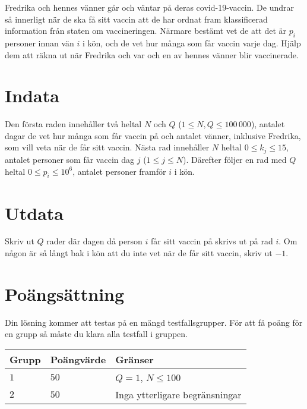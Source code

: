
Fredrika och hennes vänner går och väntar på deras covid-19-vaccin. De undrar så innerligt när de ska få sitt vaccin att de har ordnat fram klassificerad information från staten om vaccineringen. Närmare bestämt vet de att det är $p_i$ personer innan vän $i$ i kön, och de vet hur många som får vaccin varje dag. Hjälp dem att räkna ut när Fredrika och var och en av hennes vänner blir vaccinerade. 

\section*{Indata}
Den första raden innehåller två heltal $N$ och $Q$ ($1 \le N,Q \le 100\,000$), antalet dagar de vet hur många som får vaccin på och antalet vänner, inklusive Fredrika, som vill veta när de får sitt vaccin. Nästa rad innehåller $N$ heltal $0 \le k_j \le 15$, antalet personer som får vaccin dag $j$ ($1 \le j \le N$). Därefter följer en rad med $Q$ heltal $0 \le p_i \le 10^6$, antalet personer framför $i$ i kön.

\section*{Utdata}
Skriv ut $Q$ rader där dagen då person $i$ får sitt vaccin på skrivs ut på rad $i$. Om någon är så långt bak i kön att du inte vet när de får sitt vaccin, skriv ut $-1$.

\section*{Poängsättning}
Din lösning kommer att testas på en mängd testfallsgrupper.
För att få poäng för en grupp så måste du klara alla testfall i gruppen.

\noindent
\begin{tabular}{| l | l | l |}
  \hline
  Grupp & Poängvärde & Gränser \\ \hline
  $1$ & $50$ & $Q=1$, $N \le 100$ \\ \hline
  $2$ & $50$ & Inga ytterligare begränsningar  \\ \hline
\end{tabular}
